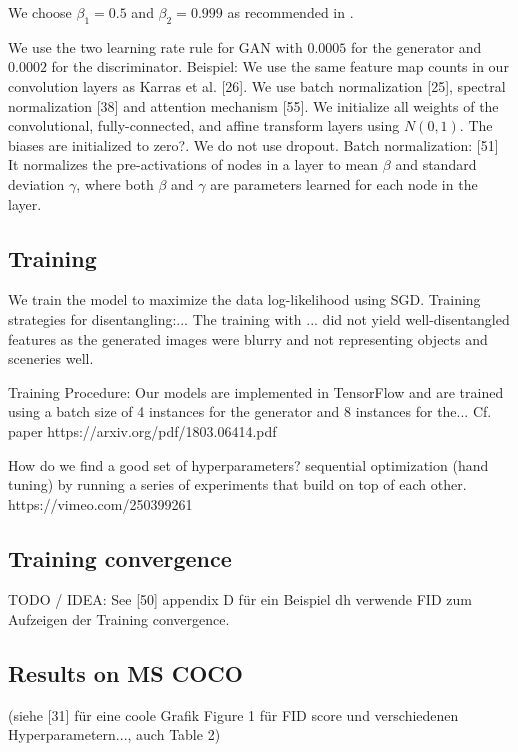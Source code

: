 \documentclass[12pt,a4paper]{article}
\begin{document}
We choose $\beta_1 = 0.5$ and $\beta_2 = 0.999$ as recommended in \cite{1807.04720}.

We use the two learning rate rule for GAN \cite{1706.08500} with $0.0005$ for the generator and $0.0002$ for the discriminator.
Beispiel: We use the same feature map counts in our convolution layers as Karras et al. [26]. We use batch normalization [25], spectral normalization [38] and attention mechanism [55].
We initialize all weights of the convolutional, fully-connected, and affine transform layers using $N(0, 1)$. The biases are initialized to zero?.
We do not use dropout.
Batch normalization: [51] It normalizes the pre-activations of nodes in a layer to mean $\beta$ and standard deviation $\gamma$, where both $\beta$ and $\gamma$ are parameters learned for each node in the layer.

\subsection{Training}
We train the model to maximize the data log-likelihood using SGD.
Training strategies for disentangling:...
The training with ... did not yield well-disentangled features as the generated images were blurry and not representing objects and sceneries well. 

\par Training Procedure: Our models are implemented in TensorFlow \cite{1605.08695} and are trained using a batch size of 4 instances for the generator and 8 instances for the...
Cf. paper https://arxiv.org/pdf/1803.06414.pdf

\par How do we find a good set of hyperparameters? sequential optimization (hand tuning) by running a series of experiments that build on top of each other. https://vimeo.com/250399261

\subsection{Training convergence}
TODO / IDEA: See [50] appendix D für ein Beispiel dh verwende FID zum Aufzeigen der Training convergence.

\subsection{Results on MS COCO}
(siehe [31] für eine coole Grafik Figure 1 für FID score und verschiedenen Hyperparametern..., auch Table 2)
\end{document}
